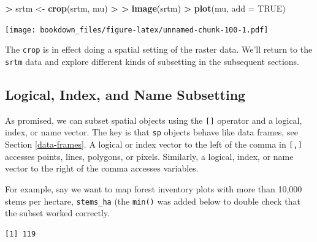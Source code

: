 \documentclass[]{krantz}
\makeatletter
\newenvironment{Shaded}{\begin{snugshade}}{\end{snugshade}}
\newcommand{\DataTypeTok}[1]{\textcolor[rgb]{0.27,0.27,0.27}{#1}}
\newcommand{\DecValTok}[1]{\textcolor[rgb]{0.06,0.06,0.06}{#1}}
\newcommand{\ErrorTok}[1]{\textcolor[rgb]{0.14,0.14,0.14}{\textbf{#1}}}
\newcommand{\FloatTok}[1]{\textcolor[rgb]{0.06,0.06,0.06}{#1}}
\newcommand{\KeywordTok}[1]{\textcolor[rgb]{0.27,0.27,0.27}{\textbf{#1}}}
\newcommand{\NormalTok}[1]{#1}
\newcommand{\OperatorTok}[1]{\textcolor[rgb]{0.43,0.43,0.43}{\textbf{#1}}}
\newcommand{\OtherTok}[1]{\textcolor[rgb]{0.37,0.37,0.37}{#1}}
\newcommand{\StringTok}[1]{\textcolor[rgb]{0.5,0.5,0.5}{#1}}
\newenvironment{kframe}{%
\medskip{}
\setlength{\fboxsep}{.8em}
 \def\at@end@of@kframe{}%
 \ifinner\ifhmode%
  \def\at@end@of@kframe{\end{minipage}}%
  \begin{minipage}{\columnwidth}%
 \fi\fi%
 \def\FrameCommand##1{\hskip\@totalleftmargin \hskip-\fboxsep
 \colorbox{shadecolor}{##1}\hskip-\fboxsep
     \hskip-\linewidth \hskip-\@totalleftmargin \hskip\columnwidth}%
 \MakeFramed {\advance\hsize-\width
   \@totalleftmargin\z@ \linewidth\hsize
   \@setminipage}}%
 {\par\unskip\endMakeFramed%
 \at@end@of@kframe}
\renewenvironment{Shaded}{\begin{kframe}}{\end{kframe}}
\makeatother
\begin{document}
\begin{Shaded}
\begin{Highlighting}[]
\OperatorTok{>}\StringTok{ }\NormalTok{srtm <-}\StringTok{ }\KeywordTok{crop}\NormalTok{(srtm, mu)}
\OperatorTok{>}\StringTok{ }
\ErrorTok{>}\StringTok{ }\KeywordTok{image}\NormalTok{(srtm)}
\OperatorTok{>}\StringTok{ }\KeywordTok{plot}\NormalTok{(mu, }\DataTypeTok{add =} \OtherTok{TRUE}\NormalTok{)}
\end{Highlighting}
\end{Shaded}

\texttt{[image: bookdown\_files/figure-latex/unnamed-chunk-100-1.pdf]}

The \texttt{crop} is in effect doing a spatial setting of the raster data. We'll return to the \texttt{srtm} data and explore different kinds of subsetting in the subsequent sections.

\hypertarget{logical-index-and-name-subsetting}{%
\subsection{Logical, Index, and Name Subsetting}\label{logical-index-and-name-subsetting}}

As promised, we can subset spatial objects using the \texttt{{[}{]}} operator and a logical, index, or name vector. The key is that \texttt{sp} objects behave like data frames, see Section \ref{data-frames}. A logical or index vector to the left of the comma in \texttt{{[},{]}} accesses points, lines, polygons, or pixels. Similarly, a logical, index, or name vector to the right of the comma accesses variables.

For example, say we want to map forest inventory plots with more than 10,000 stems per hectare, \texttt{stems\_ha} (the \texttt{min()} was added below to double check that the subset worked correctly.

\begin{Shaded}
\end{Shaded}

\begin{verbatim}
[1] 119
\end{verbatim}

\begin{Shaded}
\end{Shaded}
\end{document}
